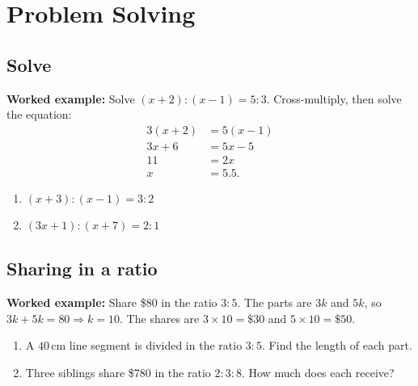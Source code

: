\documentclass[11pt]{article}
\newcommand{\ans}{\hrulefill}
\newcommand{\anshere}{\par\vspace{0.9em}\noindent\ans\par\vspace{1.3em}}
\begin{document}
\newpage

\section*{Problem Solving}

\renewcommand{\anshere}{\par\vspace{2.2em}\noindent\ans\par\vspace{3.0em}}

\begin{multicols}{2}
\subsection*{Solve}
\noindent\textbf{Worked example:} Solve $(x+2):(x-1)=5:3$. Cross-multiply, then
solve the equation:
\begin{align*}
  3(x+2) &= 5(x-1) \\
  3x+6 &= 5x-5 \\
  11 &= 2x \\
  x &= 5.5.
\end{align*}
\vspace{0.2em}
\begin{enumerate}[label=(\alph*)]
  \item $(x+3):(x-1)=3:2$
  \anshere
  \item $(3x+1):(x+7)=2:1$
  \anshere
\end{enumerate}

\vspace{0.4em}
\subsection*{Sharing in a ratio}
\noindent\textbf{Worked example:} Share \$80 in the ratio $3:5$. The parts are
$3k$ and $5k$, so $3k+5k=80 \Rightarrow k=10$. The shares are $3\times10=\$30$ and
$5\times10=\$50$.
\vspace{0.2em}
\begin{enumerate}[label=(\alph*)]
  \item A $40$\,cm line segment is divided in the ratio $3:5$. Find the length of
    each part.
  \anshere
  \item Three siblings share \$780 in the ratio $2:3:8$. How much does each
    receive?
  \anshere
\end{enumerate}

\columnbreak


\end{multicols}
\end{document}
